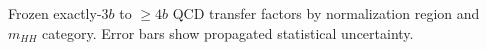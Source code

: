 Frozen exactly-$3b$ to $\geq4b$ QCD transfer factors by normalization region and $m_{HH}$ category. Error bars show propagated statistical uncertainty.
